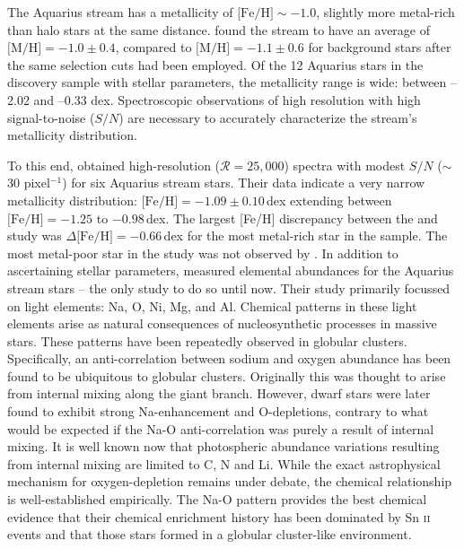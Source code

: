 \documentclass{emulateapj}
\begin{document}
The Aquarius stream has a metallicity of $\mbox{[Fe/H]} \sim -1.0$, slightly more metal-rich than halo stars at the same distance. \citet{williams;et-al_2011} found the stream to have an average of $\mbox{[M/H]} = -1.0 \pm 0.4$, compared to $\mbox{[M/H]} = -1.1 \pm 0.6$ for background stars after the same selection cuts had been employed. Of the 12 Aquarius stars in the \citet{williams;et-al_2011} discovery sample with stellar parameters, the metallicity range is wide: between --2.02 and --0.33 dex. Spectroscopic observations of high resolution with high signal-to-noise ($S/N$) are necessary to accurately characterize the stream's metallicity distribution.

To this end, \citet{wylie-de-boer;et-al_2012} obtained high-resolution ($\mathcal{R} = 25,000$) spectra with modest $S/N$ ($\sim$30 pixel$^{-1}$) for six Aquarius stream stars. Their data indicate a very narrow metallicity distribution: $\mbox{[Fe/H]} = -1.09 \pm 0.10$\,dex extending between $\mbox{[Fe/H]} = -1.25$ to $-0.98$\,dex. The largest [Fe/H] discrepancy between the \citet{williams;et-al_2011} and \citet{wylie-de-boer;et-al_2012} study was $\Delta\mbox{[Fe/H]} = -0.66$\,dex for the most metal-rich star in the \citet{williams;et-al_2011} sample. The most metal-poor star in the \citet{williams;et-al_2011} study was not observed by \citet{wylie-de-boer;et-al_2012}. 
In addition to ascertaining stellar parameters, \citet{wylie-de-boer;et-al_2012} measured elemental abundances for the Aquarius stream stars -- the only study to do so until now. Their study primarily focussed on light elements: Na, O, Ni, Mg, and Al. Chemical patterns in these light elements arise as natural consequences of nucleosynthetic processes in massive stars. These patterns have been repeatedly observed in globular clusters. Specifically, an anti-correlation between sodium and oxygen abundance has been found to be ubiquitous to globular clusters. Originally this was thought to arise from internal mixing along the giant branch. However, dwarf stars were later found to exhibit strong Na-enhancement and O-depletions, contrary to what would be expected if the Na-O anti-correlation was purely a result of internal mixing. It is well known now that photospheric abundance variations resulting from internal mixing are limited to C, N and Li. While the exact astrophysical mechanism for oxygen-depletion remains under debate, the chemical relationship is well-established empirically. The Na-O pattern provides the best chemical evidence that their chemical enrichment history has been dominated by Sn \textsc{ii} events and that those stars formed in a globular cluster-like environment.
\end{document}
